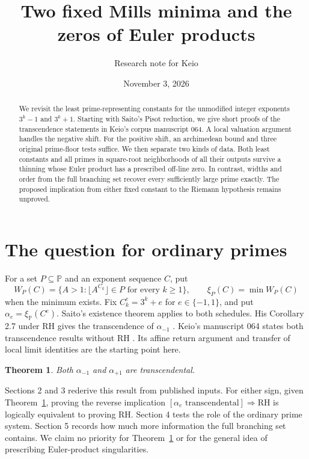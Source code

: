\documentclass[11pt]{article}
\title{Two fixed Mills minima and the zeros of Euler products}
\author{Research note for Keio}
\date{November 3, 2026}
\newtheorem{theorem}{Theorem}
\newcommand{\PP}{\mathbb P}
\newcommand{\floor}[1]{\lfloor #1\rfloor}
\begin{document}
\maketitle
\begin{abstract}
We revisit the least prime-representing constants for the unmodified integer exponents $3^k-1$ and $3^k+1$. Starting with Saito's Pisot reduction, we give short proofs of the transcendence statements in Keio's corpus manuscript 064. A local valuation argument handles the negative shift. For the positive shift, an archimedean bound and three original prime-floor tests suffice. We then separate two kinds of data. Both least constants and all primes in square-root neighborhoods of all their outputs survive a thinning whose Euler product has a prescribed off-line zero. In contrast, widths and order from the full branching set recover every sufficiently large prime exactly. The proposed implication from either fixed constant to the Riemann hypothesis remains unproved.
\end{abstract}
\section{The question for ordinary primes}
For a set $P\subseteq\PP$ and an exponent sequence $C$, put
\[
 W_P(C)=\{A>1:\floor{A^{C_k}}\in P\text{ for every }k\ge1\},\qquad
 \xi_P(C)=\min W_P(C)
\]
when the minimum exists. Fix $C_k^e=3^k+e$ for $e\in\{-1,1\}$, and put $\alpha_e=\xi_{\PP}(C^e)$. Saito's existence theorem applies to both schedules. His Corollary 2.7 under RH gives the transcendence of $\alpha_{-1}$ \cite{saito}. Keio's manuscript 064 states both transcendence results without RH \cite{keio}. Its affine return argument and transfer of local limit identities are the starting point here.
\begin{theorem}\label{th:arith}
Both $\alpha_{-1}$ and $\alpha_{+1}$ are transcendental.
\end{theorem}
Sections 2 and 3 rederive this result from published inputs. For either sign, given Theorem~\ref{th:arith}, proving the reverse implication $[\alpha_e\text{ transcendental}]\Rightarrow\mathrm{RH}$ is logically equivalent to proving RH. Section 4 tests the role of the ordinary prime system. Section 5 records how much more information the full branching set contains. We claim no priority for Theorem~\ref{th:arith} or for the general idea of prescribing Euler-product singularities.
\end{document}
